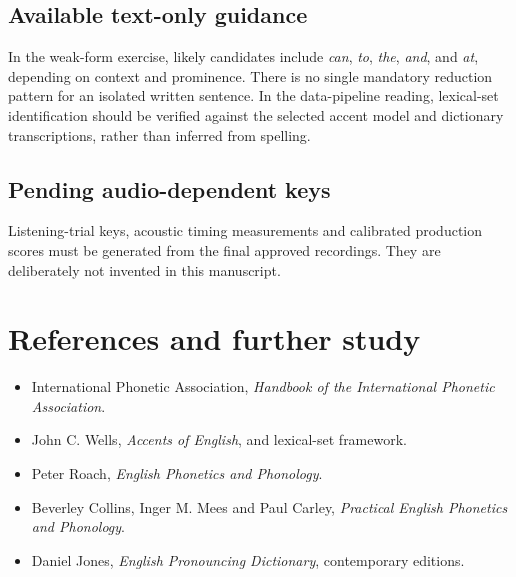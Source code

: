 \subsection{Available text-only guidance}
In the weak-form exercise, likely candidates include \emph{can}, \emph{to}, \emph{the}, \emph{and}, and \emph{at}, depending on context and prominence. There is no single mandatory reduction pattern for an isolated written sentence. In the data-pipeline reading, lexical-set identification should be verified against the selected accent model and dictionary transcriptions, rather than inferred from spelling.
\subsection{Pending audio-dependent keys}
Listening-trial keys, acoustic timing measurements and calibrated production scores must be generated from the final approved recordings. They are deliberately not invented in this manuscript.
\section{References and further study}
\begin{itemize}
\item International Phonetic Association, \emph{Handbook of the International Phonetic Association}.
\item John C. Wells, \emph{Accents of English}, and lexical-set framework.
\item Peter Roach, \emph{English Phonetics and Phonology}.
\item Beverley Collins, Inger M. Mees and Paul Carley, \emph{Practical English Phonetics and Phonology}.
\item Daniel Jones, \emph{English Pronouncing Dictionary}, contemporary editions.
\end{itemize}
% 
